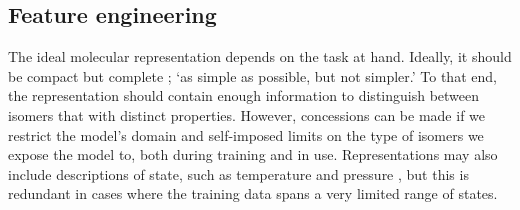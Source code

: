 \subsection{Feature engineering}

The ideal molecular representation depends on the task at hand. Ideally, it should be compact but complete \cite{faberCrystalStructureRepresentations2015,himanenDScribeLibraryDescriptors2020}; `as simple as possible, but not simpler.' To that end, the representation should contain enough information to distinguish between isomers that with distinct properties. However, concessions can be made if we restrict the model's domain and self-imposed limits on the type of isomers we expose the model to, both during training and in use. Representations may also include descriptions of state, such as temperature and pressure \cite{chenGraphNetworksUniversal2019}, but this is redundant in cases where the training data spans a very limited range of states.






